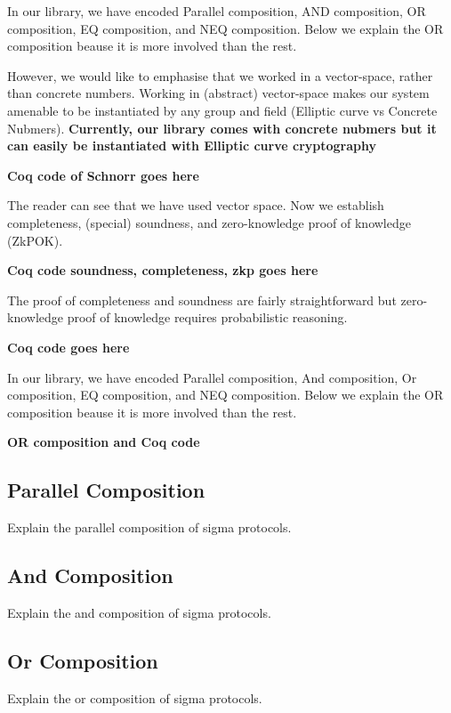 \documentclass[sigconf]{acmart}
\begin{document}
In our library, we have encoded Parallel composition, 
AND composition, OR composition, EQ composition, and 
NEQ composition. Below we explain the OR composition
beause it is more involved than the rest. 




 
 
  However, we would like 
  to emphasise that we worked in a vector-space, rather 
  than concrete numbers. Working in (abstract) vector-space makes our system 
  amenable to be instantiated by any group and field 
  (Elliptic curve vs Concrete Nubmers). \textbf{Currently, 
  our library comes with concrete nubmers but it can easily be 
  instantiated with Elliptic curve cryptography}

  \textbf{Coq code of Schnorr goes here}
  

  The reader can see that we have used vector space. Now 
  we establish completeness, (special) soundness, and zero-knowledge 
  proof of knowledge (ZkPOK). 


  \textbf{Coq code soundness, completeness, zkp goes here}

  The proof of completeness and soundness are fairly straightforward but 
  zero-knowledge proof of knowledge requires probabilistic reasoning. 
  

  \textbf{Coq code goes here}
  

  In our library, we have encoded Parallel composition, 
  And composition, Or composition, EQ composition, and 
  NEQ composition. Below we explain the OR composition
  beause it is more involved than the rest. 
  
  \textbf{OR composition and Coq code}


  \subsection{Parallel Composition}
  Explain the parallel composition of sigma protocols.

  \subsection{And Composition}
  Explain the and composition of sigma protocols.

  \subsection{Or Composition}
  Explain the or composition of sigma protocols.
\end{document}

